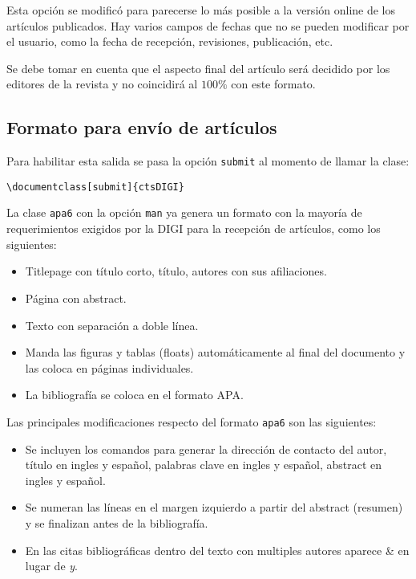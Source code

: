 \documentclass{article}
\begin{document}
Esta opción se modificó para parecerse lo más posible a la versión online de los artículos publicados. Hay varios campos de fechas que no se pueden modificar por el usuario, como la fecha de recepción, revisiones, publicación, etc.

Se debe tomar en cuenta que el aspecto final del artículo será decidido por los editores de la revista y no coincidirá al $100\%$ con este formato.

\subsection{Formato para envío de artículos}
Para habilitar esta salida se pasa la opción \texttt{submit} al momento de llamar la clase:
\begin{verbatim}
\documentclass[submit]{ctsDIGI}
\end{verbatim}

La clase \texttt{apa6} con la opción \texttt{man} ya genera un formato con la mayoría de requerimientos exigidos por la DIGI para la recepción de artículos, como los siguientes:
\begin{itemize}
\item Titlepage con título corto, título, autores con sus afiliaciones.
\item Página con abstract.
\item Texto con separación a doble línea.
\item Manda las figuras y tablas (floats) automáticamente al final del documento y las coloca en páginas individuales.
\item La bibliografía se coloca en el formato APA.
\end{itemize}

Las principales modificaciones respecto del formato \texttt{apa6} son las siguientes:
\begin{itemize}
\item Se incluyen los comandos para generar la dirección de contacto del autor, título en ingles y español, palabras clave en ingles y español, abstract en ingles y español.
\item Se numeran las líneas en el margen izquierdo a partir del abstract (resumen) y se finalizan antes de la bibliografía.
\item En las citas bibliográficas dentro del texto con multiples autores aparece \& en lugar de \emph{y}.
\end{itemize}
\end{document}
